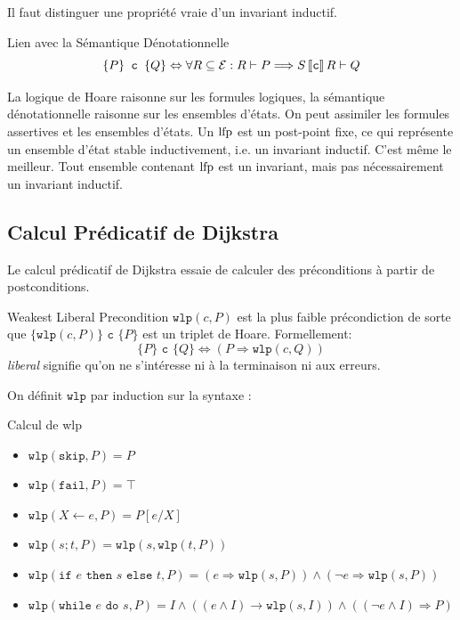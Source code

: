 \documentclass{cours}
\begin{document}
Il faut distinguer une propriété vraie d'un invariant inductif.

\begin{théorème}
{Lien avec la Sémantique Dénotationnelle}{}
\begin{equation*}
	\{P\} \texttt{ c } \{Q\} \Leftrightarrow \forall R \subseteq \mathcal{E}: R \vdash P \Longrightarrow S\left\llbracket \texttt{c} \right\rrbracket R \vdash Q
\end{equation*}
\end{théorème}
La logique de Hoare raisonne sur les formules logiques, la sémantique dénotationnelle raisonne sur les ensembles d'états.
On peut assimiler les formules assertives et les ensembles d'états.
Un $\operatorname{lfp}$ est un post-point fixe, ce qui représente un ensemble d'état stable inductivement, i.e. un invariant inductif.
C'est même le meilleur. Tout ensemble contenant $\operatorname{lfp}$ est un invariant, mais pas nécessairement un invariant inductif.

\subsection{Calcul Prédicatif de Dijkstra}
Le calcul prédicatif de Dijkstra essaie de calculer des préconditions à partir de postconditions.
\newcommand{\wlp}{\texttt{wlp}}
\begin{définition}
{Weakest Liberal Precondition}{}
$\wlp(c, P)$ est la plus faible précondiction de sorte que $\{\wlp(c, P)\} \texttt{ c } \{P\}$ est un triplet de Hoare.
Formellement:
\begin{equation*}
	\{P\} \texttt{ c } \{Q\} \Leftrightarrow \left(P \Rightarrow \wlp(c, Q)\right)
\end{equation*}
\textit{liberal} signifie qu'on ne s'intéresse ni à la terminaison ni aux erreurs.
\end{définition}

On définit $\wlp$ par induction sur la syntaxe :
\begin{définition}
{Calcul de wlp}{}
\begin{itemize}
	\item $\wlp(\texttt{skip}, P) = P$
	\item $\wlp(\texttt{fail}, P) = \top$
	\item $\wlp(X \gets e, P) = P[e/X]$
	\item $\wlp(s;t, P) = \wlp(s, \wlp(t, P))$
	\item $\wlp(\texttt{if } e \texttt{ then } s \texttt{ else } t, P) = (e \Rightarrow \wlp(s, P)) \land \left(\lnot e \Rightarrow \wlp(s, P)\right)$
	\item $\wlp(\texttt{while } e \texttt{ do } s, P) = I \land \left(\left(e\land I\right) \rightarrow \wlp(s, I) \right) \land \left(\left(\lnot e \land I\right) \Rightarrow P \right)$
\end{itemize}
\end{définition}
\end{document}
